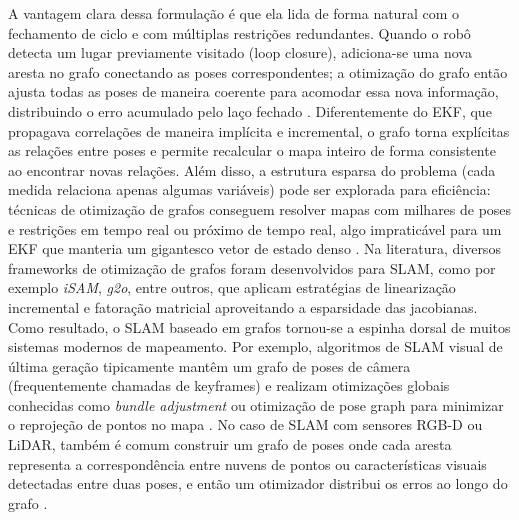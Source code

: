         A vantagem clara dessa formulação é que ela lida de forma natural com o fechamento de ciclo e com múltiplas restrições redundantes. Quando o robô detecta um lugar previamente visitado (loop closure), adiciona-se uma nova aresta no grafo conectando as poses correspondentes; a otimização do grafo então ajusta todas as poses de maneira coerente para acomodar essa nova informação, distribuindo o erro acumulado pelo laço fechado \cite{Labbe2014}. Diferentemente do EKF, que propagava correlações de maneira implícita e incremental, o grafo torna explícitas as relações entre poses e permite recalcular o mapa inteiro de forma consistente ao encontrar novas relações. Além disso, a estrutura esparsa do problema (cada medida relaciona apenas algumas variáveis) pode ser explorada para eficiência: técnicas de otimização de grafos conseguem resolver mapas com milhares de poses e restrições em tempo real ou próximo de tempo real, algo impraticável para um EKF que manteria um gigantesco vetor de estado denso \cite{Grisetti2010}. Na literatura, diversos frameworks de otimização de grafos foram desenvolvidos para SLAM, como por exemplo \textit{iSAM}, \textit{g2o}, entre outros, que aplicam estratégias de linearização incremental e fatoração matricial aproveitando a esparsidade das jacobianas. Como resultado, o SLAM baseado em grafos tornou-se a espinha dorsal de muitos sistemas modernos de mapeamento. Por exemplo, algoritmos de SLAM visual de última geração tipicamente mantêm um grafo de poses de câmera (frequentemente chamadas de keyframes) e realizam otimizações globais conhecidas como \textit{bundle adjustment} ou otimização de pose graph para minimizar o reprojeção de pontos no mapa \cite{MurArtal2017}\cite{Zhang2021}. No caso de SLAM com sensores RGB-D ou LiDAR, também é comum construir um grafo de poses onde cada aresta representa a correspondência entre nuvens de pontos ou características visuais detectadas entre duas poses, e então um otimizador distribui os erros ao longo do grafo \cite{Zhang2021}. 
        
